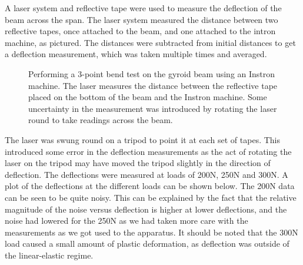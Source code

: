 \documentclass{article}
\begin{document}
A laser system and reflective tape were used to measure the deflection of the beam across the span. The laser system measured the distance between two reflective tapes, once attached to the beam, and one attached to the intron machine, as pictured. The distances were subtracted from initial distances to get a deflection measurement, which was taken multiple times and averaged.
\begin{figure}[H]
	\centering
	\caption{Performing a 3-point bend test on the gyroid beam using an Instron machine. The laser measures the distance between the reflective tape placed on the bottom of the beam and the Instron machine. Some uncertainty in the measurement was introduced by rotating the laser round to take readings across the beam.}
\end{figure}
The laser was swung round on a tripod to point it at each set of tapes. This introduced some error in the deflection measurements as the act of rotating the laser on the tripod may have moved the tripod slightly in the direction of deflection.
The deflections were measured at loads of 200N, 250N and 300N.
A plot of the deflections at the different loads can be shown below. The 200N data can be seen to be quite noisy. This can be explained by the fact that the relative magnitude of the noise versus deflection is higher at lower deflections, and the noise had lowered for the 250N as we had taken more care with the measurements as we got used to the apparatus. It should be noted that the 300N load caused a small amount of plastic deformation, as deflection was outside of the linear-elastic regime.
\end{document}
